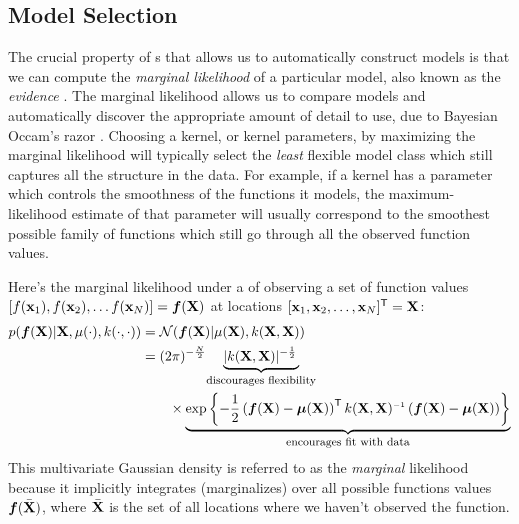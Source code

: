 \subsection{Model Selection}

The crucial property of \gp{}s that allows us to automatically construct models is that we can compute the \emph{marginal likelihood} of a particular model, also known as the \emph{evidence} \citet{mackay1992bayesian}.
The marginal likelihood allows us to compare models and automatically discover the appropriate amount of detail to use, due to Bayesian Occam's razor \citep{rasmussen2001occam,mackay2003information}.
Choosing a kernel, or kernel parameters, by maximizing the marginal likelihood will typically select the \emph{least} flexible model class which still captures all the structure in the data.
For example, if a kernel has a parameter which controls the smoothness of the functions it models, the maximum-likelihood estimate of that parameter will usually correspond to the smoothest possible family of functions which still go through all the observed function values.

Here's the marginal likelihood under a \gp{} of observing a set of function values $\left[ f({\bf{x}}_1), f({\bf{x}}_2), \ldots f({\bf{x}}_N)  \right] = \boldsymbol{f}(\mathbf{X})$ at locations $[{\bf{x}}_1, {\bf{x}}_2, \ldots, {\bf{x}}_N]^{\mathsf{T}} = \mathbf{X}$:
%
\begin{align}
p(\funcval | \vX, \mu(\cdot), k(\cdot, \cdot)) & = \N{\funcval}{\mu(\vX)}{k(\vX, \vX)} \nonumber\\
& = (2\pi)^{-\frac{N}{2}} \underwrite{ |k(\vX, \vX)|^{-\frac{1}{2}}\,}{\footnotesize discourages flexibility} \nonumber \\
& \qquad \times \underwrite{\exp \left\{ -\frac{1}{2} \left( \funcval - \boldsymbol\mu(\vX) \right)\tra k(\vX, \vX)\inv \left(\funcval - \boldsymbol\mu(\vX) \right) \right\}}{\footnotesize encourages fit with data}
\label{eq:gp_marg_lik}
\end{align}
%
This multivariate Gaussian density is referred to as the \emph{marginal} likelihood because it implicitly integrates (marginalizes) over all possible functions values $\boldsymbol{f}( \bar {\mathbf{X}})$, where $\bar {\mathbf{X}}$ is the set of all locations where we haven't observed the function.


